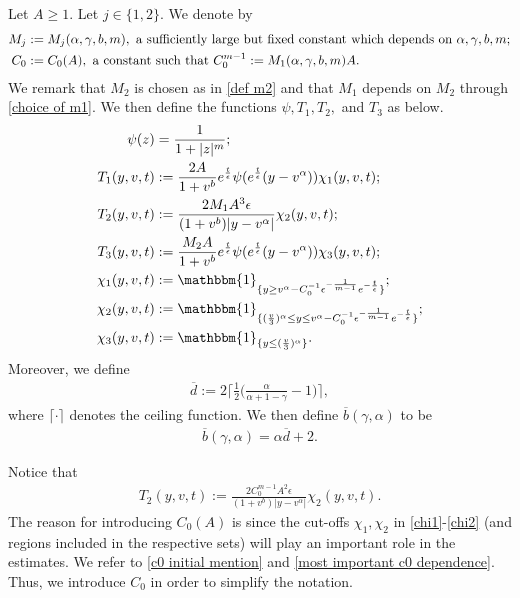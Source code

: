 \documentclass[11pt]{article}
\numberwithin{equation}{section}
\begin{document}
Let $A\geq 1$. Let $j\in\{1,2\}$. We denote by 
\begin{align}
    M_{j} &:=M_{j}(\alpha,\gamma,b,m), \textup{ a sufficiently large but fixed constant which depends on } \alpha,\gamma,b,m;\label{defm2}\\
    C_{0} &:=C_{0}(A), \textup{ a constant  such that } C_{0}^{m-1}:=M_{1}(\alpha,\gamma,b,m)A\label{defc0}.
\end{align}
We remark that $M_{2}$ is chosen as in \eqref{def m2} and that $M_{1}$ depends on $M_{2}$ through \eqref{choice of m1}. We then define the functions $\psi, T_{1},T_{2},$ and $T_{3}$ as below.
\begin{align}
        \psi(z)&=\frac{1}{1+|z|^{m}};\label{psi definition}\\
  T_{1}(y,v,t)&:=  \frac{2A}{1+v^{b}}e^{\frac{t}{\epsilon}}\psi(e^{\frac{t}{\epsilon}}(y-v^{\alpha}))     \chi_{1}(y,v,t);\label{def t1}\\
   T_{2}(y,v,t)&:=\frac{2M_{1}A^{3} \epsilon}{(1+v^{b})|y-v^{\alpha}|} \chi_{2}(y,v,t);\label{def t2}\\
     T_{3}(y,v,t)&:=  \frac{M_{2}A}{1+v^{b}}e^{\frac{t}{\epsilon}}\psi(e^{\frac{t}{\epsilon}}(y-v^{\alpha}))  \chi_{3}(y,v,t);\label{def t3}\\
     \chi_{1}(y,v,t)&:=\mathbbm{1}_{\{y\geq v^{\alpha}-C_{0}^{-1}\epsilon^{-\frac{1}{m-1}}  e^{-\frac{t}{\epsilon}}\}};\label{chi1}\\
   \chi_{2}(y,v,t)&:= \mathbbm{1}_{\{(\frac{v}{3})^{\alpha}\leq y\leq v^{\alpha}-C_{0}^{-1}\epsilon^{-\frac{1}{m-1}}  e^{-\frac{t}{\epsilon}}\}} ;\label{chi2}\\
     \chi_{3}(y,v,t)&:=\mathbbm{1}_{\{y\leq (\frac{v}{3})^{\alpha}\}}.\label{chi3}
\end{align}
Moreover, we define
 \begin{align}\label{def overline d}
 \overline{d}:=2\bigg\lceil \frac{1}{2}\bigg(\frac{\alpha}{\alpha+1-\gamma}-1\bigg)\bigg\rceil,
 \end{align} where  $\lceil\cdot \rceil$ denotes the ceiling function. We then define  $\overline{b}(\gamma,\alpha)$ to be 
 \begin{align}\label{definition overline b}
     \overline{b}(\gamma,\alpha)=\alpha \overline{d}+2.
 \end{align} 
\begin{rmk}
Notice that
\begin{align*}
 T_{2}(y,v,t):=\frac{2C_{0}^{m-1}A^{2} \epsilon}{(1+v^{b})|y-v^{\alpha}|} \chi_{2}(y,v,t).
\end{align*}
The reason for introducing $C_{0}(A)$ is since the cut-offs $\chi_{1}, \chi_{2}$ in \eqref{chi1}-\eqref{chi2} (and regions included in the respective sets) will play an important role in the estimates. We refer to \eqref{c0 initial mention} and \eqref{most important c0 dependence}. Thus, we introduce $C_{0}$ in order to simplify the notation.
\end{rmk}
\end{document}
